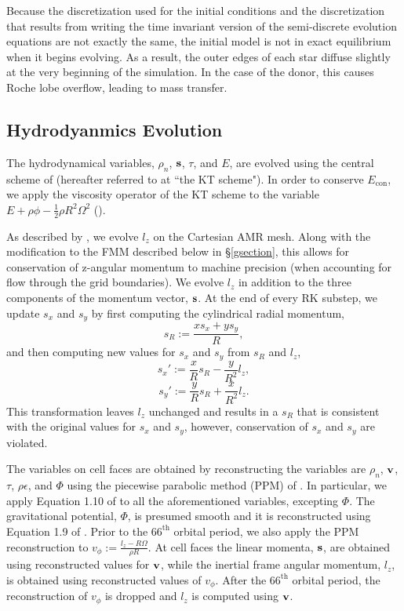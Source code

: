 \documentclass[preprint]{aastex}
\begin{document}
Because the discretization used for the initial conditions and the discretization that results from writing the time invariant version of the semi-discrete evolution equations are not exactly the same, the initial model is not in exact equilibrium when it begins evolving. As a result, the outer edges of each star diffuse slightly at the very beginning of the simulation. In the case of the donor, this causes Roche lobe overflow, leading to mass transfer.

\subsection {Hydrodyanmics Evolution}
\label{numerical_evolution}

The hydrodynamical variables, $\rho_n$, ${\bf{s}}$, $\tau$, and $E$, are evolved using the central scheme of \cite{KT2000} (hereafter referred to at ``the KT scheme"). 
In order to conserve $E_{\mathrm{con}}$, we apply the viscosity operator of the KT scheme to the variable $E + \rho \phi - \tfrac{1}{2} \rho R^2 \Omega^2$ (\cite{MT2012}).


As described by \cite{BATM2014}, we evolve $l_z$ on the Cartesian AMR mesh. Along with the modification to the FMM described below in \S \ref{gsection}, this allows for conservation of z-angular momentum
to machine precision (when accounting for flow through the grid boundaries). We evolve $l_z$ in addition to the three components of the momentum vector, ${\bf{s}}$. At the end of every RK substep, we update
$s_x$ and $s_y$ by first computing the cylindrical radial momentum, 
\begin{equation}
s_R := \frac{x s_x + y s_y}{R},
\end{equation}
and then computing new values for $s_x$ and $s_y$ from $s_R$ and $l_z$, 
\begin{equation}
{s_x}' := \frac{x}{R} s_R - \frac{y}{R^2} l_z,
\end{equation}
\begin{equation}
{s_y}' := \frac{y}{R} s_R + \frac{x}{R^2} l_z.
\end{equation}
This transformation leaves $l_z$ unchanged and results in a $s_R$ that is consistent with the original values for $s_x$ and $s_y$, however, conservation of $s_x$ and $s_y$ are violated. 


The variables on cell faces are obtained by reconstructing the variables are $\rho_n$, ${\bf{v}}$, $\tau$, $\rho \epsilon$, and $\Phi$ using the piecewise parabolic method (PPM) of \cite{CW1984}. In particular, 
we apply Equation 1.10 of  \cite{CW1984} to all the aforementioned variables, excepting $\Phi$. The gravitational potential, $\Phi$, is presumed smooth and it is reconstructed using Equation 1.9 of \cite{CW1984}.  Prior to the $66^\mathrm{th}$ orbital period, we also apply the PPM reconstruction to $v_\phi := \tfrac{l_z - R \Omega}{\rho R}$. At cell faces the linear momenta, ${\bf{s}}$, are obtained using reconstructed values for ${\bf{v}}$, while the inertial frame angular momentum, $l_z$, is obtained using reconstructed values of $v_\phi$. After the $66^\mathrm{th}$ orbital period, the reconstruction of $v_\phi$ is dropped and $l_z$ is computed using ${\bf{v}}$. 
\end{document}
